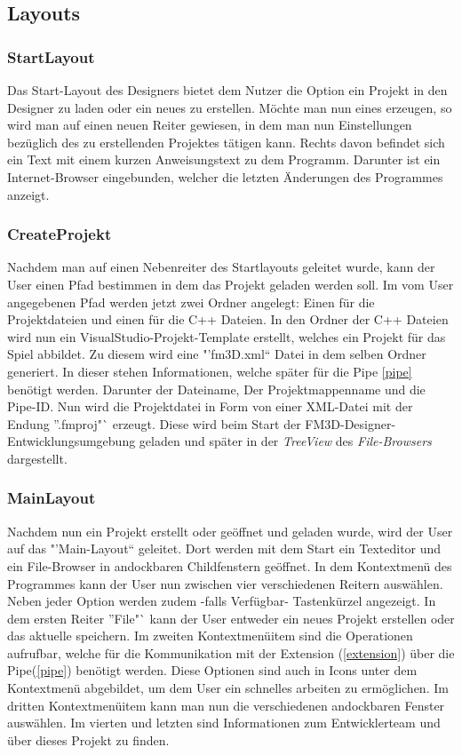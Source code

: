 \subsection{Layouts}
\subsubsection{StartLayout}
\label{startlayout}
Das Start-Layout des Designers bietet dem Nutzer die Option ein Projekt in den Designer zu laden oder ein neues zu erstellen. Möchte man nun eines erzeugen, so wird man auf einen neuen Reiter gewiesen, in dem man nun Einstellungen bezüglich des zu erstellenden Projektes tätigen kann. Rechts davon befindet sich ein Text mit einem kurzen Anweisungstext zu dem Programm. Darunter ist ein Internet-Browser eingebunden, welcher die letzten Änderungen des Programmes anzeigt.

\subsubsection{CreateProjekt}
Nachdem man auf einen Nebenreiter des Startlayouts geleitet wurde, kann der User einen Pfad bestimmen in dem das Projekt geladen werden soll. Im vom User angegebenen Pfad werden jetzt zwei Ordner angelegt: Einen für die Projektdateien und einen für die C++ Dateien. 
In den Ordner der C++ Dateien wird nun ein VisualStudio-Projekt-Template erstellt, welches ein Projekt für das Spiel abbildet. Zu diesem wird eine "'fm3D.xml"` Datei in dem selben Ordner generiert. In dieser stehen Informationen, welche später für die Pipe \ref{pipe} benötigt werden. Darunter der Dateiname, Der Projektmappenname und die Pipe-ID.
Nun wird die Projektdatei in Form von einer XML-Datei mit der Endung "'.fmproj"` erzeugt. Diese wird beim Start der FM3D-Designer-Entwicklungsumgebung geladen und später in der \textit{TreeView} des \textit{File-Browsers} dargestellt.

\subsubsection{MainLayout}
\label{mainlayout}
Nachdem nun ein Projekt erstellt oder geöffnet und geladen wurde, wird der User auf das "'Main-Layout"` geleitet. Dort werden mit dem Start ein Texteditor und ein File-Browser in andockbaren Childfenstern geöffnet. In dem Kontextmenü des Programmes kann der User nun zwischen vier verschiedenen Reitern auswählen. Neben jeder Option werden zudem -falls Verfügbar- Tastenkürzel angezeigt. 
In dem ersten Reiter "'File"` kann der User entweder ein neues Projekt erstellen oder das aktuelle speichern. 
Im zweiten Kontextmenüitem sind die Operationen aufrufbar, welche für die Kommunikation mit der Extension (\ref{extension}) über die Pipe(\ref{pipe}) benötigt werden. Diese Optionen sind auch in Icons unter dem Kontextmenü abgebildet, um dem User ein schnelles arbeiten zu ermöglichen. Im dritten Kontextmenüitem kann man nun die verschiedenen andockbaren Fenster auswählen. Im vierten und letzten sind Informationen zum Entwicklerteam und über dieses Projekt zu finden.

